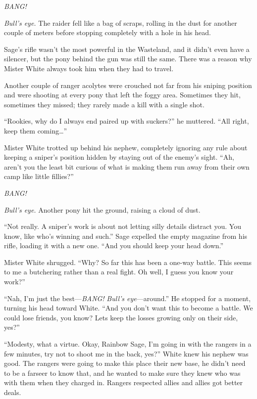 \emph{BANG!}

\emph{Bull's eye.}\/ The raider fell like a bag of scraps, rolling in the dust for another couple of meters before stopping completely with a hole in his head.

Sage's rifle wasn't the most powerful in the Wasteland, and it didn't even have a silencer, but the pony behind the gun was still the same. There was a reason why Mister White always took him when they had to travel.

Another couple of ranger acolytes were crouched not far from his sniping position and were shooting at every pony that left the foggy area. Sometimes they hit, sometimes they missed; they rarely made a kill with a single shot.

``Rookies, why do I always end paired up with suckers?'' he muttered. ``All right, keep them coming\dots''

Mister White trotted up behind his nephew, completely ignoring any rule about keeping a sniper's position hidden by staying out of the enemy's sight. ``Ah, aren't you the least bit curious of what is making them run away from their own camp like little fillies?''

\emph{BANG!}

\emph{Bull's eye.}\/ Another pony hit the ground, raising a cloud of dust.

``Not really. A sniper's work is about not letting silly details distract you. You know, like who's winning and such.'' Sage expelled the empty magazine from his rifle, loading it with a new one. ``And you should keep your head down.''

Mister White shrugged. ``Why? So far this has been a one-way battle. This seems to me a butchering rather than a real fight. Oh well, I guess you know your work?''

``Nah, I'm just the best---\emph{BANG!}\/ \emph{Bull's eye}\/---around.'' He stopped for a moment, turning his head toward White. ``And you don't want this to become a battle. We could lose friends, you know? Lets keep the losses growing only on their side, yes?''

``Modesty, what a virtue. Okay, Rainbow Sage, I'm going in with the rangers in a few minutes, try not to shoot me in the back, yes?'' White knew his nephew was good. The rangers were going to make this place their new base, he didn't need to be a farseer to know that, and he wanted to make sure they knew who was with them when they charged in. Rangers respected allies and allies got better deals.

